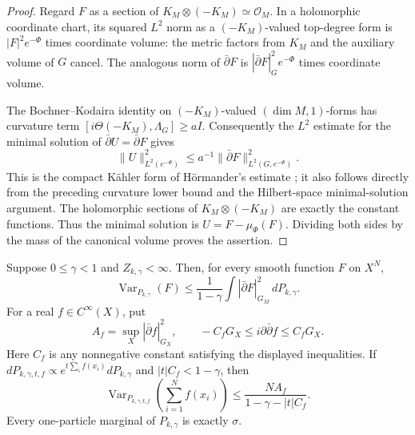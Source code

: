 \begin{proof}
Regard $F$ as a section of
$K_M\otimes(-K_M)\simeq\mathcal O_M$.  In a holomorphic coordinate
chart, its squared $L^2$ norm as a $(-K_M)$-valued top-degree form is
$|F|^2e^{-\Phi}$ times coordinate volume: the metric factors from
$K_M$ and the auxiliary volume of $G$ cancel.  The analogous norm
of $\bar\partial F$ is
$|\bar\partial F|_G^2e^{-\Phi}$ times coordinate volume.

The Bochner--Kodaira identity on $(-K_M)$-valued $(\dim M,1)$-forms
has curvature term $[i\Theta(-K_M),\Lambda_G]\ge aI$.
Consequently the $L^2$ estimate for the minimal solution of
$\bar\partial U=\bar\partial F$ gives
\[
 \|U\|_{L^2(e^{-\Phi})}^2
 \le a^{-1}\|\bar\partial F\|_{L^2(G,e^{-\Phi})}^2.
\]
This is the compact K\"ahler form of H\"ormander's estimate
\cite{Hormander1965}; it also follows directly from the preceding
curvature lower bound and the Hilbert-space minimal-solution argument.
The holomorphic sections of $K_M\otimes(-K_M)$ are exactly the
constant functions.  Thus the minimal solution is
$U=F-\mu_\Phi(F)$.  Dividing both sides by the mass of the canonical
volume proves the assertion.
\end{proof}

\begin{proposition}
\label{ac:variance}
Suppose $0\le\gamma<1$ and $Z_{k,\gamma}<\infty$.
Then, for every smooth function $F$ on $X^N$,
\begin{equation}
 \operatorname{Var}_{P_{k,\gamma}}(F)
 \le\frac1{1-\gamma}
       \int|\bar\partial F|_{G_M}^2\,dP_{k,\gamma}.
 \label{ac:variance-eq}
\end{equation}
For a real $f\in C^\infty(X)$, put
\[
 A_f=\sup_X|\bar\partial f|_{G_X}^2,
 \qquad
 -C_fG_X\le i\partial\bar\partial f\le C_fG_X.
\]
Here $C_f$ is any nonnegative constant satisfying the displayed
inequalities.  If
$dP_{k,\gamma,t,f}\propto e^{t\sum_i f(x_i)}dP_{k,\gamma}$ and
$|t|C_f<1-\gamma$, then
\begin{equation}
 \operatorname{Var}_{P_{k,\gamma,t,f}}
          \left(\sum_{i=1}^N f(x_i)\right)
 \le\frac{NA_f}{1-\gamma-|t|C_f}.
 \label{ac:tilted-variance}
\end{equation}
Every one-particle marginal of $P_{k,\gamma}$ is exactly $\sigma$.
\end{proposition}

